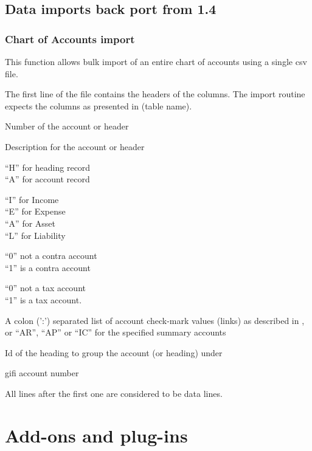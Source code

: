 \section{Data imports back port from 1.4}
\label{sec-customization-import-routines-from-14}

\subsection{Chart of Accounts import}
\label{subsec-customization-import-coa}

This function allows bulk import of an entire chart of accounts using a
single \gls{csv} file.

The first line of the file contains the headers of the columns. The
import routine expects the columns as presented in (table name).

\begin{description}[style=nextline]
\item [accno] Number of the account or header
\item [desc] Description for the account or header
\item [charttype] ``H'' for heading record \\
``A'' for account record
\item [category] ``I'' for Income \\
``E'' for Expense \\
``A'' for Asset \\
``L'' for Liability
\item [contra] ``0'' not a \gls{contra} account \\
``1'' is a \gls{contra} account
\item [tax] ``0'' not a tax account \\
``1'' is a tax account.
\item [link] A colon (':') separated list of account check-mark values (links) as described
    in , or ``AR'', ``AP'' or ``IC'' for the specified summary accounts
\item [heading] Id of the heading to group the account (or heading) under
\item [gifi] \gls{gifi} account number
\end{description}

All lines after the first one are considered to be data lines.

\chapter{Add-ons and plug-ins}
\label{cha-customization-add-ons}


